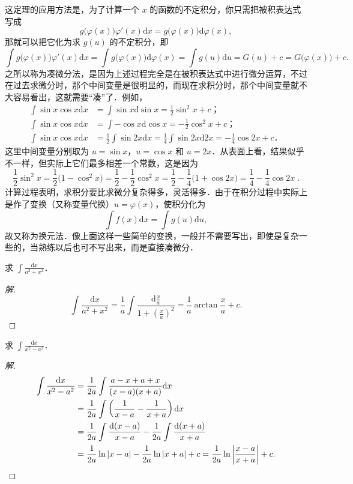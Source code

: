 这定理的应用方法是，为了计算一个 $x$ 的函数的不定积分，你只需把被积表达式写成
\[
g\big(\varphi(x)\big)\varphi'(x)\mathrm{d}x = g\big(\varphi(x)\big)\mathrm{d}\varphi(x),
\]
那就可以把它化为求 $g(u)$ 的不定积分，即
\[
\int g\big(\varphi(x)\big)\varphi'(x)\mathrm{d}x
= \int g\big(\varphi(x)\big)\mathrm{d}\varphi(x)
= \int g(u)\mathrm{d}u = G(u) + c = G\big(\varphi(x)\big) + c.
\]
之所以称为凑微分法，是因为上述过程完全是在被积表达式中进行微分运算，不过在过去求微分时，那个中间变量是很明显的，而现在求积分时，那个中间变量就不大容易看出，这就需要``凑''了．例如，
\begin{align*}
\int\sin x\cos x\mathrm{d}x &= \int\sin x\mathrm{d}\sin x = \frac{1}{2}\sin^{2}x + c\text{；}\\
\int\sin x\cos x\mathrm{d}x &= \int-\cos x\mathrm{d}\cos x = -\frac{1}{2}\cos^{2}x + c\text{；}\\
\int\sin x\cos x\mathrm{d}x &= \frac{1}{2}\int\sin 2x\mathrm{d}x
= \frac{1}{4}\int\sin 2x\mathrm{d}2x = -\frac{1}{4}\cos 2x + c\text{．}
\end{align*}
这里中间变量分别取为 $u = \sin x$，$u = \cos x$ 和 $u = 2x$．从表面上看，结果似乎不一样，但实际上它们最多相差一个常数，这是因为
\[
\frac{1}{2}\sin^{2}x = \frac{1}{2}\big(1 - \cos^{2}x\big)
= \frac{1}{2} - \frac{1}{2}\cos^{2}x
= \frac{1}{2} - \frac{1}{4}\big(1 + \cos 2x\big)
= \frac{1}{4} - \frac{1}{4}\cos 2x\;.
\]
计算过程表明，求积分要比求微分复杂得多，灵活得多．由于在积分过程中实际上是作了变换（又称变量代换）$u = \varphi(x)$，使积分化为
\[
\int f(x)\mathrm{d}x = \int g(u)\mathrm{d}u,
\]
故又称为换元法．像上面这样一些简单的变换，一般并不需要写出，即使是复杂一些的，当熟练以后也可不写出来，而是直接凑微分．

\begin{example}\label{ex:6-2-1}
求 $\displaystyle\int\frac{\mathrm{d}x}{a^{2}+x^{2}}$．
\end{example}

\begin{proof}[解]
\[
\int\frac{\mathrm{d}x}{a^{2}+x^{2}}
= \frac{1}{a}\int\frac{\mathrm{d}\frac{x}{a}}{1+\left(\frac{x}{a}\right)^{2}}
= \frac{1}{a}\arctan\frac{x}{a} + c.
\]
\end{proof}

\begin{example}\label{ex:6-2-2}
求 $\displaystyle\int\frac{\mathrm{d}x}{x^{2}-a^{2}}$．
\end{example}

\begin{proof}[解]
\begin{align*}
\int\frac{\mathrm{d}x}{x^{2}-a^{2}}
&= \frac{1}{2a}\int\frac{a-x+a+x}{(x-a)(x+a)}\mathrm{d}x\\
&= \frac{1}{2a}\int\left(\frac{1}{x-a}-\frac{1}{x+a}\right)\mathrm{d}x\\
&= \frac{1}{2a}\int\frac{\mathrm{d}(x-a)}{x-a}-\frac{1}{2a}\int\frac{\mathrm{d}(x+a)}{x+a}\\
&= \frac{1}{2a}\ln|x-a|-\frac{1}{2a}\ln|x+a|+c
= \frac{1}{2a}\ln\left|\frac{x-a}{x+a}\right|+c.\qedhere
\end{align*}
\end{proof}

